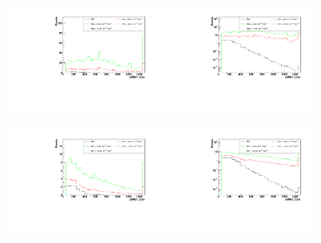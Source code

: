 \begin{figure}[h]
  \begin{center}
	\includegraphics[width=0.45\textwidth]{Plots/aQGC_kinematics/pfMET_Corr_FS0.pdf}%
	\includegraphics[width=0.45\textwidth]{Plots/aQGC_kinematics/pfMET_Corr_FS0_log.pdf}\\				
    \caption{}
  \end{center}
\end{figure}
\begin{figure}[h]
  \begin{center}
	\includegraphics[width=0.45\textwidth]{Plots/aQGC_kinematics/pfMET_Corr_FS1.pdf}%
	\includegraphics[width=0.45\textwidth]{Plots/aQGC_kinematics/pfMET_Corr_FS1_log.pdf}\\				
    \caption{}
  \end{center}
\end{figure}
